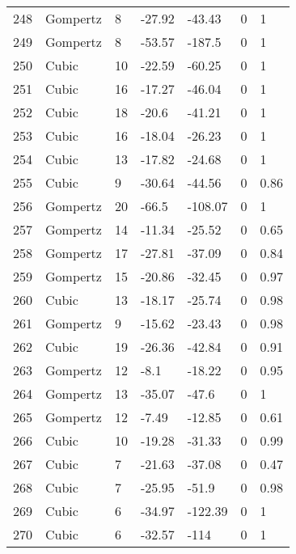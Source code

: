 \documentclass[11pt]{article}
\begin{document}
\begin{center}
\begin{longtable}{lllllll}
    248 & Gompertz  & 8               & -27.92  & -43.43  & 0       & 1    \\
    249 & Gompertz  & 8               & -53.57  & -187.5  & 0       & 1    \\
    250 & Cubic     & 10              & -22.59  & -60.25  & 0       & 1    \\
    251 & Cubic     & 16              & -17.27  & -46.04  & 0       & 1    \\
    252 & Cubic     & 18              & -20.6   & -41.21  & 0       & 1    \\
    253 & Cubic     & 16              & -18.04  & -26.23  & 0       & 1    \\
    254 & Cubic     & 13              & -17.82  & -24.68  & 0       & 1    \\
    255 & Cubic     & 9               & -30.64  & -44.56  & 0       & 0.86 \\
    256 & Gompertz  & 20              & -66.5   & -108.07 & 0       & 1    \\
    257 & Gompertz  & 14              & -11.34  & -25.52  & 0       & 0.65 \\
    258 & Gompertz  & 17              & -27.81  & -37.09  & 0       & 0.84 \\
    259 & Gompertz  & 15              & -20.86  & -32.45  & 0       & 0.97 \\
    260 & Cubic     & 13              & -18.17  & -25.74  & 0       & 0.98 \\
    261 & Gompertz  & 9               & -15.62  & -23.43  & 0       & 0.98 \\
    262 & Cubic     & 19              & -26.36  & -42.84  & 0       & 0.91 \\
    263 & Gompertz  & 12              & -8.1    & -18.22  & 0       & 0.95 \\
    264 & Gompertz  & 13              & -35.07  & -47.6   & 0       & 1    \\
    265 & Gompertz  & 12              & -7.49   & -12.85  & 0       & 0.61 \\
    266 & Cubic     & 10              & -19.28  & -31.33  & 0       & 0.99 \\
    267 & Cubic     & 7               & -21.63  & -37.08  & 0       & 0.47 \\
    268 & Cubic     & 7               & -25.95  & -51.9   & 0       & 0.98 \\
    269 & Cubic     & 6               & -34.97  & -122.39 & 0       & 1    \\
    270 & Cubic     & 6               & -32.57  & -114    & 0       & 1    \\

\end{longtable}
\end{center}
\end{document}
